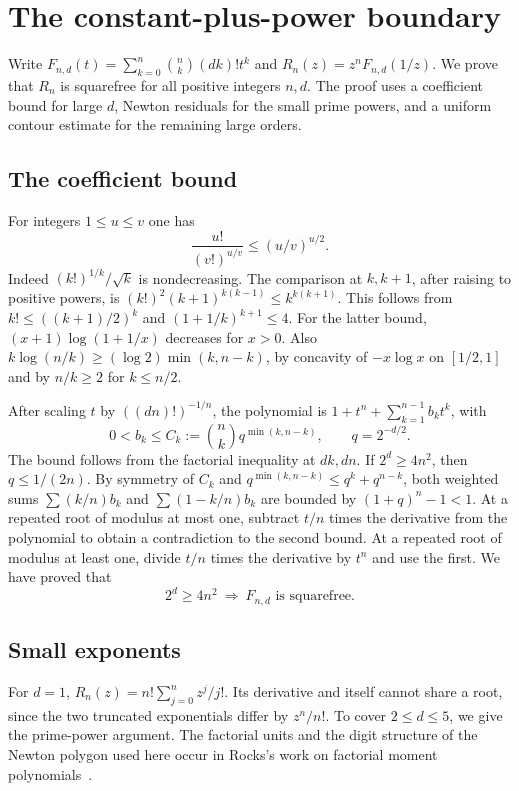\section{The constant-plus-power boundary}
\label{app:constant-proof}

Write \(F_{n,d}(t)=\sum_{k=0}^n\binom nk(dk)!t^k\) and
\(R_n(z)=z^nF_{n,d}(1/z)\). We prove that \(R_n\) is squarefree
for all positive integers \(n,d\). The proof uses a coefficient
bound for large \(d\), Newton residuals for the small prime powers,
and a uniform contour estimate for the remaining large orders.

\subsection{The coefficient bound}

For integers \(1\le u\le v\) one has
\[
 \frac{u!}{(v!)^{u/v}}\le (u/v)^{u/2}.
\]
Indeed \((k!)^{1/k}/\sqrt{k}\) is nondecreasing. The comparison
at \(k,k+1\), after raising to positive powers, is
\((k!)^2(k+1)^{k(k-1)}\le k^{k(k+1)}\). This follows from
\(k!\le((k+1)/2)^k\) and \((1+1/k)^{k+1}\le4\). For the latter
bound, \((x+1)\log(1+1/x)\) decreases for \(x>0\).
Also \(k\log(n/k)\ge(\log2)\min(k,n-k)\), by concavity of
\(-x\log x\) on \([1/2,1]\) and by \(n/k\ge2\) for \(k\le n/2\).

After scaling \(t\) by \(((dn)!)^{-1/n}\), the polynomial is
\(1+t^n+\sum_{k=1}^{n-1}b_kt^k\), with
\[
 0<b_k\le C_k:=\binom nk q^{\min(k,n-k)},\qquad q=2^{-d/2}.
\]
The bound follows from the factorial inequality at \(dk,dn\).
If \(2^d\ge4n^2\), then \(q\le1/(2n)\).
By symmetry of \(C_k\) and \(q^{\min(k,n-k)}\le q^k+q^{n-k}\),
both weighted sums \(\sum(k/n)b_k\) and
\(\sum(1-k/n)b_k\) are bounded by \((1+q)^n-1<1\).
At a repeated root of modulus at most one, subtract \(t/n\) times
the derivative from the polynomial to obtain a contradiction to
the second bound. At a repeated root of modulus at least one,
divide \(t/n\) times the derivative by \(t^n\) and use the first.
We have proved that
\begin{equation}
 2^d\ge4n^2 \ \Longrightarrow\  F_{n,d}\text{ is squarefree}.
 \label{eq:constant-large-gap}
\end{equation}

\subsection{Small exponents}

For \(d=1\), \(R_n(z)=n!\sum_{j=0}^n z^j/j!\). Its derivative
and itself cannot share a root, since the two truncated
exponentials differ by \(z^n/n!\). To cover \(2\le d\le5\),
we give the prime-power argument. The factorial units and the
digit structure of the Newton polygon used here occur in
Rocks's work on factorial moment polynomials~\cite{rocks}.

